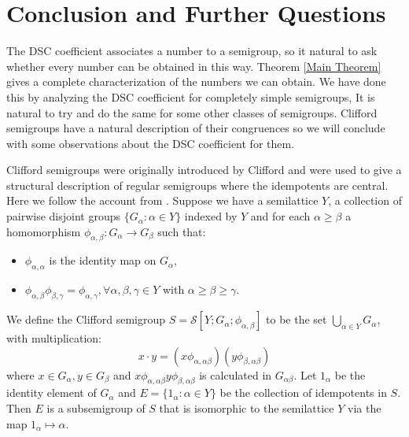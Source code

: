 \documentclass[a4paper, 12pt,reqno]{amsart}
\theoremstyle{plain}
\theoremstyle{definition}
\theoremstyle{remark}
\begin{document}
\section{Conclusion and Further Questions}

The DSC coefficient associates a number to a semigroup, so it natural to ask whether every number can be obtained in this way. 
Theorem \ref{Main Theorem} gives a complete characterization of the numbers we can obtain.
We have done this by analyzing the DSC coefficient for completely simple semigroups, It is natural to try and do the same for some other classes of semigroups.
Clifford semigroups have a natural description of their congruences so we will conclude with some observations about the DSC coefficient for them.

Clifford semigroups were originally introduced by Clifford \cite{Clifford1941} and were used to give a structural description of regular semigroups where the idempotents are central.
Here we follow the account from \cite[Section 4.2]{Ho95}.
Suppose we have a semilattice $Y$, a collection of pairwise disjoint groups $\{G_\alpha : \alpha \in Y \}$ indexed by $Y$ and for each $\alpha \geq \beta$ a homomorphism  $\phi_{\alpha ,\beta}: G_\alpha \to G_\beta$ such that:
\begin{itemize}
    \item $\phi_{\alpha , \alpha} $ is the identity map on $G_\alpha$,
    \item $\phi_{\alpha,\beta} \phi_{\beta,\gamma} = \phi_{\alpha,\gamma}, \forall \alpha,\beta,\gamma \in Y$ with $\alpha \geq \beta \geq \gamma$.
\end{itemize}
We define the Clifford semigroup $S = \mathcal{S}[Y;G_\alpha ; \phi_{\alpha,\beta}]$ to be the set $\bigcup_{\alpha \in Y}G_{\alpha}$, with multiplication:
\begin{equation*}
    x \cdot y = (x\phi_{\alpha,\alpha \beta})( y \phi_{\beta, \alpha \beta})
\end{equation*}
where $x \in G_{\alpha} , y \in G_{\beta}$ and $x\phi_{\alpha,\alpha \beta} y \phi_{\beta, \alpha \beta}$ is calculated in $G_{\alpha \beta}$.
Let $1_\alpha$ be the identity element of $G_\alpha$ and $E = \{ 1_\alpha : \alpha \in Y \}$ be the collection of idempotents in $S$.
Then $E$ is a subsemigroup of $S$ that is isomorphic to the semilattice $Y$ via the map $1_\alpha \mapsto \alpha$.
\end{document}
